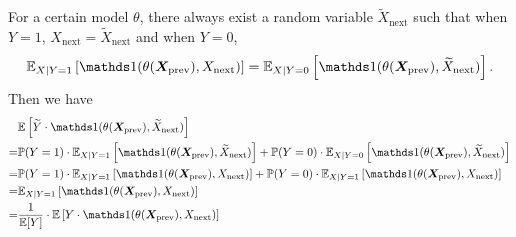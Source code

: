 For a certain model $\theta$, there always exist a random variable $\widetilde X_{\text{next}}$ such that when $Y=1$, $X_{\text{next}} = \widetilde X_{\text{next}}$  and when $Y=0$,
$$
 \E_{X|Y=1}\left[ \BR{(\theta(\bm X_{\text{prev}}), X_{\text{next}})}  \right] 
= \E_{X|Y=0}\left[ \BR{(\theta(\bm X_{\text{prev}}), \widetilde X_{\text{next}})}  \right].
$$
Then we have
\begin{align*}
    & \E\left[ \widetilde Y \cdot \BR{(\theta(\bm X_{\text{prev}}), \widetilde X_{\text{next}})}  \right] \\
  = & \PP(Y=1) \cdot \E_{X|Y=1}\left[ \BR{(\theta(\bm X_{\text{prev}}), \widetilde X_{\text{next}})}  \right] + \PP(Y=0) \cdot \E_{X|Y=0}\left[ \BR{(\theta(\bm X_{\text{prev}}), \widetilde X_{\text{next}})}  \right] \\
  = & \PP(Y=1) \cdot \E_{X|Y=1}\left[ \BR{(\theta(\bm X_{\text{prev}}),  X_{\text{next}})}  \right] + \PP(Y=0) \cdot \E_{X|Y=1}\left[ \BR{(\theta(\bm X_{\text{prev}}),  X_{\text{next}})}  \right] \\
  = & \E_{X|Y=1}\left[ \BR{(\theta(\bm X_{\text{prev}}),  X_{\text{next}})}  \right] \\
  = & \frac{1}{\E[Y]} \cdot \E\left[ Y \cdot \BR{(\theta(\bm X_{\text{prev}}),  X_{\text{next}})}  \right]
\end{align*}

